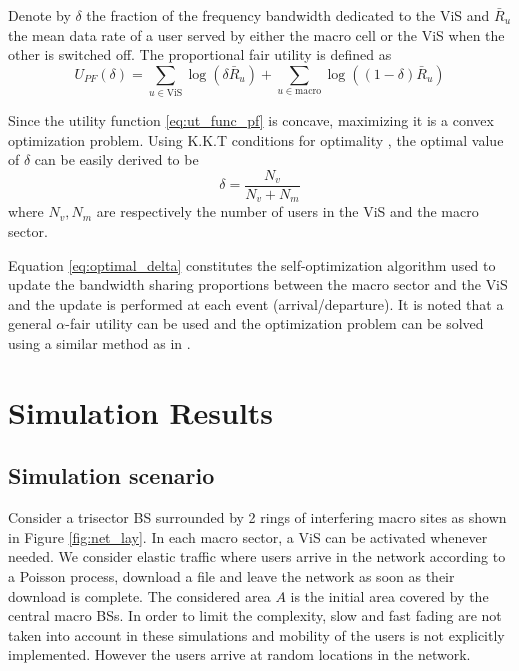 \documentclass[conference]{IEEEtran}
\begin{document}
	Denote by $\delta$ the fraction of the frequency bandwidth dedicated to the \ac{ViS} and $\bar{R}_u$ the mean data rate of a user served by either the macro cell or the \ac{ViS} when the other is switched off. The proportional fair utility is defined as
	\begin{equation} \label{eq:ut_func_pf}
	U_{PF}(\delta) = \sum_{u \in \text{ViS}} \log(\delta \bar{R}_u) + \sum_{u \in \text{macro}} \log((1-\delta) \bar{R}_u)
	\end{equation}

	Since the utility function \eqref{eq:ut_func_pf} is concave, maximizing it is a convex optimization problem. Using \ac{K.K.T} conditions for optimality \cite{boyd_convexoptimization_2004}, the optimal value of $\delta$ can be easily derived to be
	\begin{equation} \label{eq:optimal_delta}
		\delta = \frac{N_v}{N_v+N_m}
	\end{equation}
	where $N_v,N_m$ are respectively the number of users in the \ac{ViS} and the macro sector.

	Equation \eqref{eq:optimal_delta} constitutes the self-optimization algorithm used to update the bandwidth sharing proportions between the macro sector and the \ac{ViS} and the update is performed at each event (arrival/departure). It is noted that a general $\alpha$-fair utility \cite{altman_generalizedalphafair_2008} can be used and the optimization problem can be solved using a similar method as in \cite{tall_selfoptimizingstrategies_2015}.

\section{Simulation Results} \label{sec:perf_results}
\subsection{Simulation scenario}
	Consider a trisector \ac{BS} surrounded by 2 rings of interfering macro sites as shown in Figure \ref{fig:net_lay}. In each macro sector, a \ac{ViS} can be activated whenever needed. We consider elastic traffic where users arrive in the network according to a Poisson process, download a file and leave the network as soon as their download is complete. The considered area $A$ is the initial area covered by the central macro \acp{BS}. In order to limit the complexity, slow and fast fading are not taken into account in these simulations and mobility of the users is not explicitly implemented. However the users arrive at random locations in the network.
\end{document}
